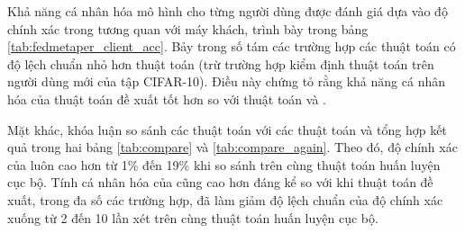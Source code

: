 \begin{table}
    \centering
    \caption{Bảng độ chính xác (\%) của thuật toán FedPer và các thuật toán FedMeta-Per tính trên máy khách (dữ liệu Non-IID)}
    \label{tab:fedmetaper_client_acc}
\end{table}

Khả năng cá nhân hóa mô hình cho từng người dùng được đánh giá dựa vào độ chính xác trong tương quan với máy khách, trình bày trong bảng \ref{tab:fedmetaper_client_acc}. Bảy trong số tám các trường hợp các thuật toán  có độ lệch chuẩn nhỏ hơn thuật toán  (trừ trường hợp kiểm định thuật toán  trên người dùng mới của tập CIFAR-10). Điều này chứng tỏ rằng khả năng cá nhân hóa của thuật toán đề xuất tốt hơn so với thuật toán  và .

Mặt khác, khóa luận so sánh các thuật toán  với các thuật toán  và tổng hợp kết quả trong hai bảng \ref{tab:compare} và \ref{tab:compare_again}. Theo đó, độ chính xác của  luôn cao hơn  từ 1\% đến 19\% khi so sánh trên cùng thuật toán huấn luyện cục bộ. Tính cá nhân hóa của  cũng cao hơn đáng kể so với  khi thuật toán đề xuất, trong đa số các trường hợp, đã làm giảm độ lệch chuẩn của độ chính xác xuống từ 2 đến 10 lần xét trên cùng thuật toán huấn luyện cục bộ.

